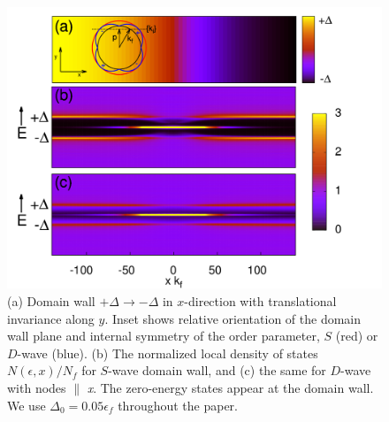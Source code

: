 \documentclass[prb,aps,showpacs,amsmath,twocolumn,10pt]{revtex4-1}
\begin{document}
\begin{figure}
\includegraphics[scale=0.21]{./Fig1}
\caption{\label{fig:1}
\quad(a) Domain wall $+\Delta \to -\Delta$ in $x$-direction with translational
invariance along $y$. Inset shows relative orientation of the domain wall plane 
and internal symmetry of the order parameter, $S$ (red) or $D$-wave (blue). 
(b) The normalized local density of states $N(\epsilon,x)/N_f$ for $S$-wave domain wall, and  
(c) the same for $D$-wave with nodes $\parallel$ \emph{x}. The zero-energy states appear at the domain wall. 
We use $\Delta_0=0.05\epsilon_f$ throughout the paper.  
} 
\end{figure}

\end{document}
